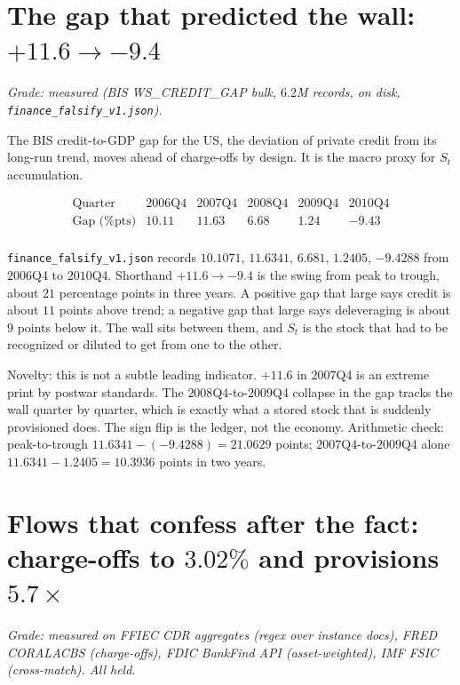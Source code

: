\section{The gap that predicted the wall: $+11.6\to -9.4$}
\label{sec:bis-gap}

\textit{Grade: measured (BIS WS\_CREDIT\_GAP bulk, $6.2$M records, on disk, \texttt{finance\_falsify\_v1.json}).}

The BIS credit-to-GDP gap for the US, the deviation of private credit from its long-run trend, moves ahead of charge-offs by design. It is the macro proxy for $S_t$ accumulation.

\[
\begin{array}{lccccc}
\text{Quarter} & 2006\text{Q4} & 2007\text{Q4} & 2008\text{Q4} & 2009\text{Q4} & 2010\text{Q4} \\
\text{Gap (\% pts)} & 10.11 & 11.63 & 6.68 & 1.24 & -9.43 \\
\end{array}
\]

\texttt{finance\_falsify\_v1.json} records $10.1071$, $11.6341$, $6.681$, $1.2405$, $-9.4288$ from $2006$Q4 to $2010$Q4. Shorthand $+11.6\to-9.4$ is the swing from peak to trough, about $21$ percentage points in three years. A positive gap that large says credit is about $11$ points above trend; a negative gap that large says deleveraging is about $9$ points below it. The wall sits between them, and $S_t$ is the stock that had to be recognized or diluted to get from one to the other.

Novelty: this is not a subtle leading indicator. $+11.6$ in $2007$Q4 is an extreme print by postwar standards. The $2008$Q4-to-$2009$Q4 collapse in the gap tracks the wall quarter by quarter, which is exactly what a stored stock that is suddenly provisioned does. The sign flip is the ledger, not the economy. Arithmetic check: peak-to-trough $11.6341-(-9.4288)=21.0629$ points; $2007$Q4-to-$2009$Q4 alone $11.6341-1.2405=10.3936$ points in two years.

\section{Flows that confess after the fact: charge-offs to $3.02\%$ and provisions $5.7\times$}
\label{sec:flows}

\textit{Grade: measured on FFIEC CDR aggregates (regex over instance docs), FRED CORALACBS (charge-offs), FDIC BankFind API (asset-weighted), IMF FSIC (cross-match). All held.}

